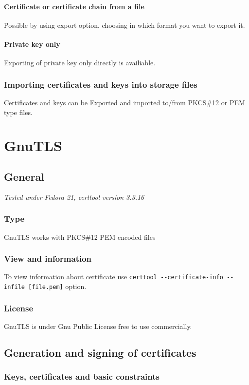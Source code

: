 \documentclass[10pt, a4paper]{report}
\begin{document}
    \subsubsection{Certificate or certificate chain from a file}
Possible by using export option, choosing in which format you want to export it.

    \subsubsection{Private key only}
Exporting of private key only directly is availiable.

  \subsection{Importing certificates and keys into storage files}
Certificates and keys can be Exported and imported to/from PKCS\#12 or PEM type files.

\chapter{GnuTLS}

\section{General}

\textit{Tested under Fedora 21, certtool version 3.3.16}

  \subsection{Type}
GnuTLS works with PKCS\#12 PEM encoded files
  \subsection{View and information}
To view information about certificate use \verb+certtool --certificate-info --infile [file.pem]+ option.
  \subsection{License}
GnuTLS is under Gnu Public License \- free to use commercially.
  
\section{Generation and signing of certificates}

  \subsection{Keys, certificates and basic constraints}
  
\end{document}
